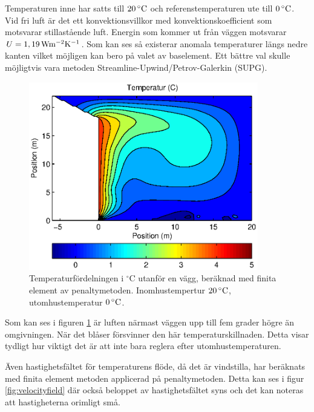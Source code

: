 Temperaturen inne har satts till $\unit[20]{^\circ C}$ och referenstemperaturen ute till 
$\unit[0]{^\circ C}$. Vid fri luft är det ett konvektionsvillkor med konvektionskoefficient 
som motsvarar stillastående luft. Energin som kommer ut från väggen motsvarar 
$U = \unit[1,19]{Wm^{-2}K^{-1}}$. Som kan ses så existerar anomala temperaturer längs 
nedre kanten vilket möjligen kan bero på valet av baselement. Ett bättre val skulle möjligtvis vara metoden Streamline-Upwind/Petrov-Galerkin (SUPG).


\begin{figure}[hpbt]
\centering
\includegraphics[width=10cm]{images/convectemperature.eps}
\caption{\label{fig:temp_dist}Temperaturfördelningen i $^\circ\mbox{C}$ utanför en vägg, beräknad med finita element av penaltymetoden. Inomhustempertur $\unit[20]{^\circ C}$, utomhustemperatur $\unit[0]{^\circ C}$.}
\end{figure}

Som kan ses i figuren \ref{fig:temp_dist} är luften närmast väggen upp till fem grader 
högre än omgivningen. När det blåser försvinner den här temperaturskillnaden. Detta 
visar tydligt hur viktigt det är att inte bara reglera efter utomhustemperaturen. 


Även hastighetsfältet för temperaturens flöde, då det är vindstilla, har beräknats med finita element metoden 
applicerad på penaltymetoden. Detta kan ses i figur \ref{fig:velocityfield} där också 
beloppet av hastighetsfältet syns och det kan noteras att hastigheterna orimligt små.

